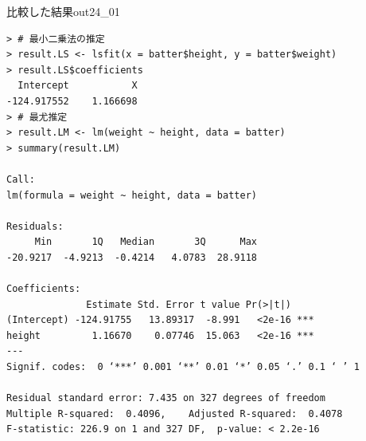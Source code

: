 \begin{Rscreen}{比較した結果}{out24_01}
	\begin{verbatim}
> # 最小二乗法の推定
> result.LS <- lsfit(x = batter$height, y = batter$weight)
> result.LS$coefficients
  Intercept           X 
-124.917552    1.166698 
> # 最尤推定
> result.LM <- lm(weight ~ height, data = batter)
> summary(result.LM)

Call:
lm(formula = weight ~ height, data = batter)

Residuals:
     Min       1Q   Median       3Q      Max 
-20.9217  -4.9213  -0.4214   4.0783  28.9118 

Coefficients:
              Estimate Std. Error t value Pr(>|t|)    
(Intercept) -124.91755   13.89317  -8.991   <2e-16 ***
height         1.16670    0.07746  15.063   <2e-16 ***
---
Signif. codes:  0 ‘***’ 0.001 ‘**’ 0.01 ‘*’ 0.05 ‘.’ 0.1 ‘ ’ 1

Residual standard error: 7.435 on 327 degrees of freedom
Multiple R-squared:  0.4096,	Adjusted R-squared:  0.4078 
F-statistic: 226.9 on 1 and 327 DF,  p-value: < 2.2e-16
    \end{verbatim}
\end{Rscreen}
